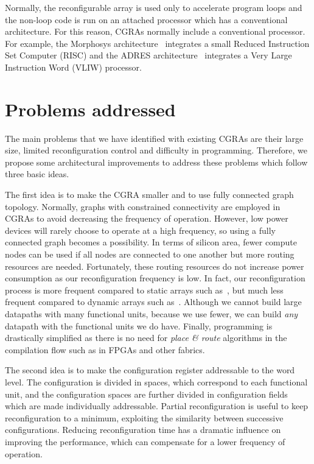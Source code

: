 Normally, the reconfigurable array is used only to accelerate program
loops and the non-loop code is run on an attached processor which has
a conventional architecture. For this reason, CGRAs normally include a
conventional processor. For example, the Morphosys
architecture~\cite{Lee00} integrates a small Reduced Instruction Set
Computer (RISC) and the ADRES architecture~\cite{Mei05} integrates a
Very Large Instruction Word (VLIW) processor.


\section{Problems addressed}
\label{section:problemsAddressed}

The main problems that we have identified with existing CGRAs are
their large size, limited reconfiguration control and difficulty
in programming. Therefore, we propose some architectural improvements
to address these problems which follow three basic ideas.

The first idea is to make the CGRA smaller and to use fully connected
graph topology. Normally, graphs with constrained connectivity are
employed in CGRAs to avoid decreasing the frequency of
operation. However, low power devices will rarely choose to operate at
a high frequency, so using a fully connected graph becomes a
possibility. In terms of silicon area, fewer compute nodes can be used
if all nodes are connected to one another but more routing resources
are needed. Fortunately, these routing resources do not increase power
consumption as our reconfiguration frequency is low. In fact, our
reconfiguration process is more frequent compared to static arrays
such as~\cite{Hartenstein99}, but much less frequent compared to
dynamic arrays such as~\cite{Mei05}. Although we cannot build large
datapaths with many functional units, because we use fewer, we can
build {\it any} datapath with the functional units we do have.
Finally, programming is drastically simplified as there is no need for
{\em place \& route} algorithms in the compilation flow such as in
FPGAs and other fabrics.

The second idea is to make the configuration register addressable to
the word level. The configuration is divided in spaces, which
correspond to each functional unit, and the configuration spaces are
further divided in configuration fields which are made individually
addressable. Partial reconfiguration is useful to keep reconfiguration
to a minimum, exploiting the similarity between successive
configurations. Reducing reconfiguration time has a dramatic influence
on improving the performance, which can compensate for a lower
frequency of operation.

